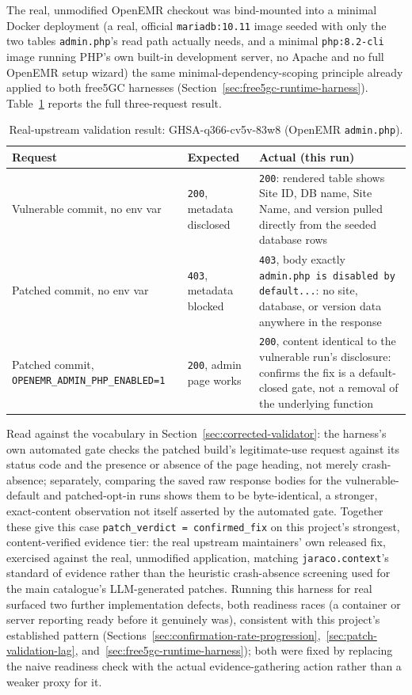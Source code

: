 \documentclass[12pt,a4paper]{report}
\begin{document}
The real, unmodified OpenEMR checkout was bind-mounted into a minimal Docker deployment (a real, official \texttt{mariadb:10.11} image seeded with only the two tables \texttt{admin.php}'s read path actually needs, and a minimal \texttt{php:8.2-cli} image running PHP's own built-in development server, no Apache and no full OpenEMR setup wizard) the same minimal-dependency-scoping principle already applied to both free5GC harnesses (Section~\ref{sec:free5gc-runtime-harness}). Table~\ref{tab:openemr} reports the full three-request result.

\begin{table}[H]
\centering
\caption{Real-upstream validation result: GHSA-q366-cv5v-83w8 (OpenEMR \texttt{admin.php}).}
\label{tab:openemr}
\begin{tabular}{@{}p{4.5cm}p{3.2cm}p{5.3cm}@{}}
\toprule
\textbf{Request} & \textbf{Expected} & \textbf{Actual (this run)} \\
\midrule
Vulnerable commit, no env var & \texttt{200}, metadata disclosed & \texttt{200}: rendered table shows Site ID, DB name, Site Name, and version pulled directly from the seeded database rows \\
Patched commit, no env var & \texttt{403}, metadata blocked & \texttt{403}, body exactly \texttt{admin.php is disabled by default...}: no site, database, or version data anywhere in the response \\
Patched commit, \texttt{OPENEMR\_ADMIN\_PHP\_ENABLED=1} & \texttt{200}, admin page works & \texttt{200}, content identical to the vulnerable run's disclosure: confirms the fix is a default-closed gate, not a removal of the underlying function \\
\bottomrule
\end{tabular}
\end{table}

Read against the vocabulary in Section~\ref{sec:corrected-validator}: the harness's own automated gate checks the patched build's legitimate-use request against its status code and the presence or absence of the page heading, not merely crash-absence; separately, comparing the saved raw response bodies for the vulnerable-default and patched-opt-in runs shows them to be byte-identical, a stronger, exact-content observation not itself asserted by the automated gate. Together these give this case \texttt{patch\_verdict = confirmed\_fix} on this project's strongest, content-verified evidence tier: the real upstream maintainers' own released fix, exercised against the real, unmodified application, matching \texttt{jaraco.context}'s standard of evidence rather than the heuristic crash-absence screening used for the main catalogue's LLM-generated patches. Running this harness for real surfaced two further implementation defects, both readiness races (a container or server reporting ready before it genuinely was), consistent with this project's established pattern (Sections~\ref{sec:confirmation-rate-progression},~\ref{sec:patch-validation-lag}, and~\ref{sec:free5gc-runtime-harness}); both were fixed by replacing the naive readiness check with the actual evidence-gathering action rather than a weaker proxy for it.
\end{document}

